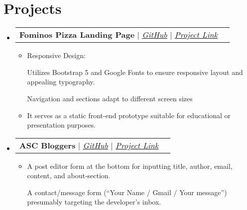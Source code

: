 \documentclass[letterpaper,11pt]{article}
\makeatletter
\newcommand{\resumeItem}[1]{
  \item\small{
    {#1 \vspace{-2pt}}
  }
}
\newcommand{\resumeProjectHeading}[2]{
    \vspace{-2pt}\item
    \begin{tabular*}{0.97\textwidth}{l@{\extracolsep{\fill}}r}
      \small#1 & #2 \\
    \end{tabular*}\vspace{-7pt}
}
\newcommand{\resumeSubHeadingListStart}{\begin{itemize}[leftmargin=0.15in, label={}]}
\newcommand{\resumeSubHeadingListEnd}{\end{itemize}}
\newcommand{\resumeItemListStart}{\begin{itemize}}
\newcommand{\resumeItemListEnd}{\end{itemize}\vspace{-5pt}}
\makeatother
\begin{document}

\section{Projects}
  \vspace{3pt}
  \resumeSubHeadingListStart

  
\resumeProjectHeading
{\textbf{Fominos Pizza Landing Page} $|$ \underline{\emph{\href{https://github.com/123danghi/OCTANET_OCTOBER/blob/main/Fominos\%20PIZZA.html}{GitHub}}} $|$ \underline{\emph{\href{https://123danghi.github.io/OCTANET_OCTOBER/Fominos\%20PIZZA.html}{Project Link}}}} {}
      \resumeItemListStart
      \resumeItem{Responsive Design:

Utilizes Bootstrap 5 and Google Fonts to ensure responsive layout and appealing typography.

Navigation and sections adapt to different screen sizes}\resumeItem{It serves as a static front-end prototype suitable for educational or presentation purposes.}
        \resumeItemListEnd

\resumeProjectHeading
{\textbf{ASC Bloggers} $|$ \underline{\emph{\href{https://github.com/123danghi/webproject_blogging00}{GitHub}}} $|$ \underline{\emph{\href{https://123danghi.github.io/webproject_blogging00/BLOG_WEBSITE.html}{Project Link}}}} {}
      \resumeItemListStart
      \resumeItem{A post editor form at the bottom for inputting title, author, email, content, and about‑section.

A contact/message form (“Your Name / Gmail / Your message”) presumably targeting the developer’s inbox.}
        \resumeItemListEnd


  \resumeSubHeadingListEnd


\end{document}
